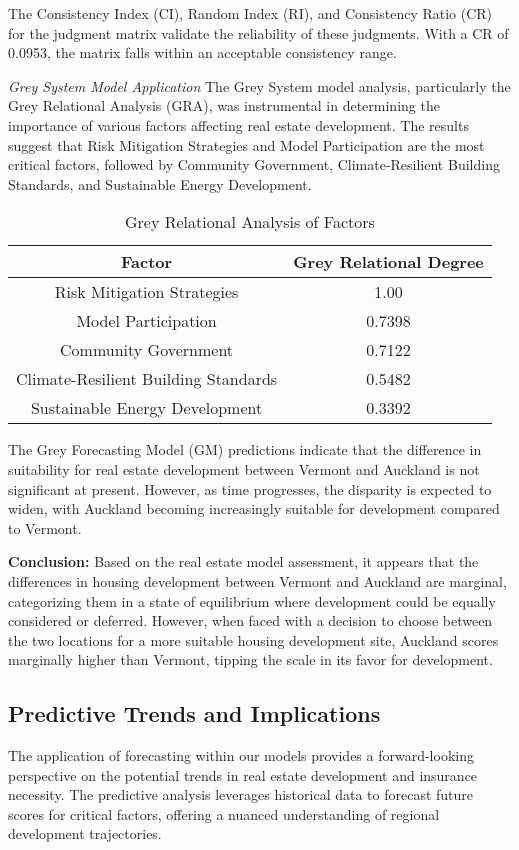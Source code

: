 \documentclass{mcmthesis}
\begin{document}
The Consistency Index (CI), Random Index (RI), and Consistency Ratio (CR) for the judgment matrix validate the reliability of these judgments. With a CR of 0.0953, the matrix falls within an acceptable consistency range.

\textit{Grey System Model Application}
The Grey System model analysis, particularly the Grey Relational Analysis (GRA), was instrumental in determining the importance of various factors affecting real estate development. The results suggest that Risk Mitigation Strategies and Model Participation are the most critical factors, followed by Community Government, Climate-Resilient Building Standards, and Sustainable Energy Development.

\begin{table}[h]
\centering
\caption{Grey Relational Analysis of Factors}
\label{table:gra_factors}
\begin{tabular}{|c|c|}
\hline
\textbf{Factor} & \textbf{Grey Relational Degree} \\
\hline
Risk Mitigation Strategies & 1.00 \\
\hline
Model Participation & 0.7398 \\
\hline
Community Government & 0.7122\\
\hline
Climate-Resilient Building Standards & 0.5482 \\
\hline
Sustainable Energy Development & 0.3392 \\
\hline
\end{tabular}
\end{table}

The Grey Forecasting Model (GM) predictions indicate that the difference in suitability for real estate development between Vermont and Auckland is not significant at present. However, as time progresses, the disparity is expected to widen, with Auckland becoming increasingly suitable for development compared to Vermont.

\textbf{Conclusion:}
Based on the real estate model assessment, it appears that the differences in housing development between Vermont and Auckland are marginal, categorizing them in a state of equilibrium where development could be equally considered or deferred. However, when faced with a decision to choose between the two locations for a more suitable housing development site, Auckland scores marginally higher than Vermont, tipping the scale in its favor for development.

\subsection{Predictive Trends and Implications}
The application of forecasting within our models provides a forward-looking perspective on the potential trends in real estate development and insurance necessity. The predictive analysis leverages historical data to forecast future scores for critical factors, offering a nuanced understanding of regional development trajectories.
\end{document}

